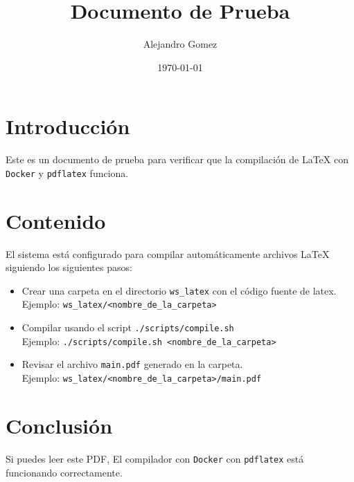 \documentclass{article}
\title{Documento de Prueba}
\author{Alejandro Gomez}
\date{\today}
\begin{document}
\maketitle

\section{Introducción}

Este es un documento de prueba para verificar que la compilación de LaTeX con \texttt{Docker} y \texttt{pdflatex} funciona.

\section{Contenido}

El sistema está configurado para compilar automáticamente archivos LaTeX siguiendo los siguientes pasos:
\begin{itemize}
    \item Crear una carpeta en el directorio \texttt{ws\_latex} con el código fuente de latex. \\
    Ejemplo: \texttt{ws\_latex/<nombre\_de\_la\_carpeta>}
    \item Compilar usando el script \texttt{./scripts/compile.sh} \\
    Ejemplo: \texttt{./scripts/compile.sh <nombre\_de\_la\_carpeta>}
    \item Revisar el archivo \texttt{main.pdf} generado en la carpeta. \\ Ejemplo: \texttt{ws\_latex/<nombre\_de\_la\_carpeta>/main.pdf}
\end{itemize}

\section{Conclusión}

Si puedes leer este PDF, El compilador con \texttt{Docker} con \texttt{pdflatex} está funcionando correctamente.
\end{document}
